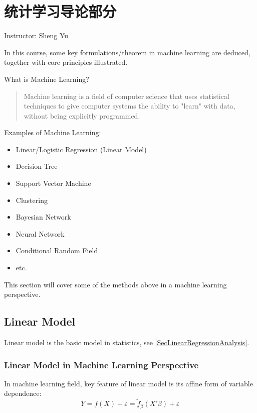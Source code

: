 \section{统计学习导论部分}
\begin{center}
    Instructor: Sheng Yu
\end{center}
    

    In this course, some key formulations/theorem in machine learning are deduced, together with core principles illustrated.

\begin{point}
    What is Machine Learning?
\end{point}

\begin{quote}
    Machine learning is a field of computer science that uses statistical techniques to give computer systems the ability to "learn" with data, without being explicitly programmed.
\end{quote}

Examples of Machine Learning:
    \begin{itemize}[topsep=2pt,itemsep=0pt]
        \item Linear/Logistic Regression (Linear Model)
        \item Decision Tree
        \item Support Vector Machine
        \item Clustering
        \item Bayesian Network
        \item Neural Network
        \item Conditional Random Field
        \item etc.
\end{itemize}

    This section will cover some of the methods above in a machine learning perspective.

\subsection{Linear Model}
    Linear model is the basic model in statistics, see \autoref{SecLinearRegressionAnalysis}. 

\subsubsection{Linear Model in Machine Learning Perspective}
    In machine learning field, key feature of linear model is its affine form of variable dependence:
    \[
        Y=f(X)+\varepsilon = \tilde{f}_\beta (X'\beta )+\varepsilon  
    \]

